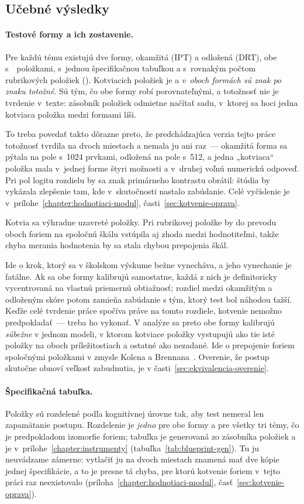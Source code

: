 \subsection{Učebné výsledky}

\paragraph{Testové formy a ich zostavenie.} Pre každú tému existujú dve formy, okamžitá (IPT) a odložená (DRT), obe s~\asmFormItems{}~položkami, s~jednou špecifikačnou tabuľkou a s~rovnakým počtom rubrikových položiek (\asmOpenPerForm). Kotviacich položiek je \asmAnchors{} a \emph{v~oboch formách sú znak po znaku totožné}. Sú tým, čo obe formy robí porovnateľnými, a totožnosť nie je tvrdenie v~texte: zásobník položiek odmietne načítať sadu, v~ktorej sa hoci jedna kotviaca položka medzi formami líši.

To treba povedať takto dôrazne preto, že predchádzajúca verzia tejto práce totožnosť tvrdila na dvoch miestach a nemala ju ani raz~--- okamžitá forma sa pýtala na pole s~1024 prvkami, odložená na pole s~512, a jedna „kotviaca“ položka mala v~jednej forme štyri možnosti a v~druhej voľnú numerickú odpoveď. Pri pol logitu rozdielu by sa znak primárneho kontrastu obrátil: štúdia by vykázala zlepšenie tam, kde v~skutočnosti nastalo zabúdanie. Celé vyčíslenie je v~prílohe~\ref{chapter:hodnotiaci-modul}, časti~\ref{sec:kotvenie-oprava}.

Kotvia sa výhradne uzavreté položky. Pri rubrikovej položke by do prevodu oboch foriem na spoločnú škálu vstúpila aj zhoda medzi hodnotiteľmi, takže chyba merania hodnotenia by sa stala chybou prepojenia škál.

Ide o krok, ktorý sa v školskom výskume bežne vynecháva, a jeho vynechanie je fatálne. Ak sa obe formy kalibrujú samostatne, každá z nich je definitoricky vycentrovaná na vlastnú priemernú obtiažnosť; rozdiel medzi okamžitým a odloženým skóre potom zamieňa zabúdanie s tým, ktorý test bol náhodou ťažší. Keďže celé tvrdenie práce spočíva práve na tomto rozdiele, kotvenie nemožno predpokladať~--- treba ho vykonať. V analýze sa preto obe formy kalibrujú \emph{súbežne} v jednom modeli, v ktorom kotviace položky vystupujú ako tie isté položky na oboch príležitostiach a ostatné ako nezadané. Ide o prepojenie foriem spoločnými položkami v zmysle Kolena a Brennana~\cite{kolen2014equating}. Overenie, že postup skutočne obnoví veľkosť zabudnutia, je v časti~\ref{sec:ekvivalencia-overenie}.

\paragraph{Špecifikačná tabuľka.} Položky sú rozdelené podľa kognitívnej úrovne tak, aby test nemeral len zapamätanie postupu. Rozdelenie je \emph{jedno} pre obe formy a pre všetky tri témy, čo je predpokladom izomorfie foriem; tabuľka je generovaná zo zásobníka položiek a je v~prílohe~\ref{chapter:instrumenty} (tabuľka~\ref{tab:blueprint-gen}). Tu ju neuvádzame zámerne: vytlačiť ju na dvoch miestach znamená mať dve kópie jednej špecifikácie, a to je presne tá chyba, pre ktorú kotvenie foriem v~tejto práci raz neexistovalo (príloha~\ref{chapter:hodnotiaci-modul}, časť~\ref{sec:kotvenie-oprava}).

